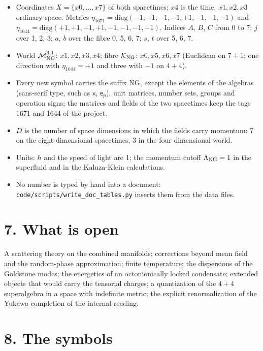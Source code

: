 \documentclass[
  10pt,
]{article}
\providecommand{\tightlist}{%
  \setlength{\itemsep}{0pt}\setlength{\parskip}{0pt}}
\begin{document}
\begin{itemize}
\tightlist
\item
  Coordinates \(X=\{x0,\dots,x7\}\) of both spacetimes; \(x4\) is the
  time, \(x1,x2,x3\) ordinary space. Metrics
  \(\eta_{1671}=\mathrm{diag}(-1,-1,-1,-1,+1,-1,-1,-1)\) and
  \(\eta_{1644}=\mathrm{diag}(+1,+1,+1,+1,-1,-1,-1,-1)\). Indices \(A\),
  \(B\), \(C\) from 0 to 7; \(j\) over 1, 2, 3; \(a\), \(b\) over the
  fibre 0, 5, 6, 7; \(s\), \(t\) over 5, 6, 7.
\item
  World \(\mathcal M^{3,1}_{\rm NG}\): \(x1,x2,x3,x4\); fibre
  \(\mathcal K_{\rm NG}\): \(x0,x5,x6,x7\) (Euclidean on \(7+1\); one
  direction with \(\eta_{1644}=+1\) and three with \(-1\) on \(4+4\)).
\item
  Every new symbol carries the suffix NG, except the elements of the
  algebras (sans-serif type, such as \(\mathsf x\), \(\mathsf e_p\)),
  unit matrices, number sets, groups and operation signs; the matrices
  and fields of the two spacetimes keep the tags 1671 and 1644 of the
  project.
\item
  \(D\) is the number of space dimensions in which the fields carry
  momentum: 7 on the eight-dimensional spacetimes, 3 in the
  four-dimensional world.
\item
  Units: \(\hbar\) and the speed of light are 1; the momentum cutoff
  \(\Lambda_{\rm NG}=1\) in the superfluid and in the Kaluza-Klein
  calculations.
\item
  No number is typed by hand into a document:
  \texttt{code/scripts/write\_doc\_tables.py} inserts them from the data
  files.
\end{itemize}

\hypertarget{what-is-open}{%
\section{7. What is open}\label{what-is-open}}

A scattering theory on the combined manifolds; corrections beyond mean
field and the random-phase approximation; finite temperature; the
dispersions of the Goldstone modes; the energetics of an octonionically
locked condensate; extended objects that would carry the tensorial
charges; a quantization of the \(4+4\) superalgebra in a space with
indefinite metric; the explicit renormalization of the Yukawa completion
of the internal reading.

\hypertarget{the-symbols}{%
\section{8. The symbols}\label{the-symbols}}
\end{document}
